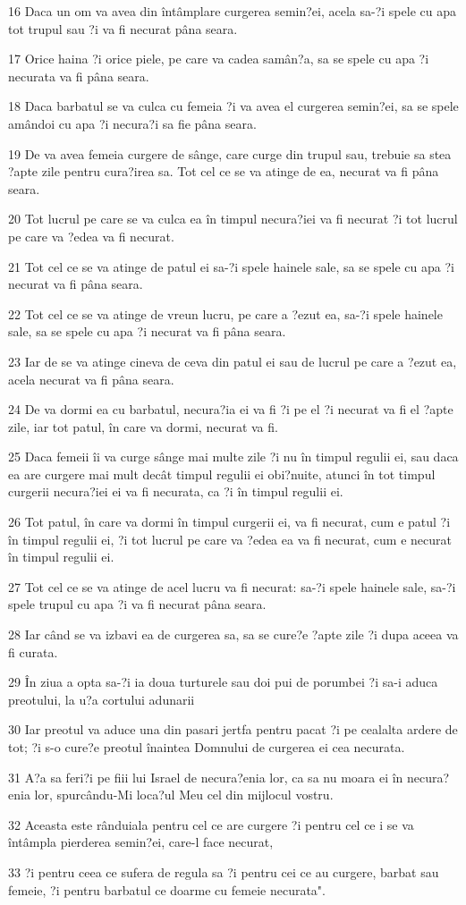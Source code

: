 \par 16 Daca un om va avea din întâmplare curgerea semin?ei, acela sa-?i spele cu apa tot trupul sau ?i va fi necurat pâna seara.
\par 17 Orice haina ?i orice piele, pe care va cadea samân?a, sa se spele cu apa ?i necurata va fi pâna seara.
\par 18 Daca barbatul se va culca cu femeia ?i va avea el curgerea semin?ei, sa se spele amândoi cu apa ?i necura?i sa fie pâna seara.
\par 19 De va avea femeia curgere de sânge, care curge din trupul sau, trebuie sa stea ?apte zile pentru cura?irea sa. Tot cel ce se va atinge de ea, necurat va fi pâna seara.
\par 20 Tot lucrul pe care se va culca ea în timpul necura?iei va fi necurat ?i tot lucrul pe care va ?edea va fi necurat.
\par 21 Tot cel ce se va atinge de patul ei sa-?i spele hainele sale, sa se spele cu apa ?i necurat va fi pâna seara.
\par 22 Tot cel ce se va atinge de vreun lucru, pe care a ?ezut ea, sa-?i spele hainele sale, sa se spele cu apa ?i necurat va fi pâna seara.
\par 23 Iar de se va atinge cineva de ceva din patul ei sau de lucrul pe care a ?ezut ea, acela necurat va fi pâna seara.
\par 24 De va dormi ea cu barbatul, necura?ia ei va fi ?i pe el ?i necurat va fi el ?apte zile, iar tot patul, în care va dormi, necurat va fi.
\par 25 Daca femeii îi va curge sânge mai multe zile ?i nu în timpul regulii ei, sau daca ea are curgere mai mult decât timpul regulii ei obi?nuite, atunci în tot timpul curgerii necura?iei ei va fi necurata, ca ?i în timpul regulii ei.
\par 26 Tot patul, în care va dormi în timpul curgerii ei, va fi necurat, cum e patul ?i în timpul regulii ei, ?i tot lucrul pe care va ?edea ea va fi necurat, cum e necurat în timpul regulii ei.
\par 27 Tot cel ce se va atinge de acel lucru va fi necurat: sa-?i spele hainele sale, sa-?i spele trupul cu apa ?i va fi necurat pâna seara.
\par 28 Iar când se va izbavi ea de curgerea sa, sa se cure?e ?apte zile ?i dupa aceea va fi curata.
\par 29 În ziua a opta sa-?i ia doua turturele sau doi pui de porumbei ?i sa-i aduca preotului, la u?a cortului adunarii
\par 30 Iar preotul va aduce una din pasari jertfa pentru pacat ?i pe cealalta ardere de tot; ?i s-o cure?e preotul înaintea Domnului de curgerea ei cea necurata.
\par 31 A?a sa feri?i pe fiii lui Israel de necura?enia lor, ca sa nu moara ei în necura?enia lor, spurcându-Mi loca?ul Meu cel din mijlocul vostru.
\par 32 Aceasta este rânduiala pentru cel ce are curgere ?i pentru cel ce i se va întâmpla pierderea semin?ei, care-l face necurat,
\par 33 ?i pentru ceea ce sufera de regula sa ?i pentru cei ce au curgere, barbat sau femeie, ?i pentru barbatul ce doarme cu femeie necurata".

